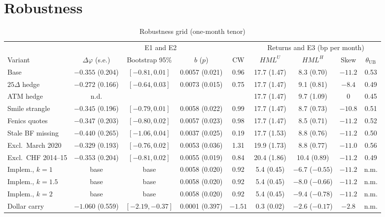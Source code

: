 \documentclass[11pt]{article}
\theoremstyle{result}
\newcommand{\HML}{\mathit{HML}}
\newcommand{\thUB}{\theta_{\mathrm{UB}}}
\newcommand{\D}{\Delta}
\begin{document}
\section{Robustness}\label{sec:robust}

\begin{table}[t]
\centering\footnotesize
\setlength{\tabcolsep}{2pt}
\caption{Robustness grid (one-month tenor)}\label{tab:rob}
\begin{tabular}{lcccccccc}
\toprule
 & \multicolumn{4}{c}{E1 and E2} & \multicolumn{4}{c}{Returns and E3 (bp per month)}\\
\cmidrule(lr){2-5}\cmidrule(lr){6-9}
Variant & $\D\varphi$ (s.e.) & Bootstrap 95\% & $b$ ($p$) & CW & $\HML^U$ & $\HML^H$ & Skew & $\thUB$ \\
\midrule
Base & $-0.355$ (0.204) & $[-0.81,0.01]$ & 0.0057 (0.021) & 0.96 & 17.7 (1.47) & 8.3 (0.70) & $-11.2$ & 0.53 \\
$25\D$ hedge & $-0.272$ (0.166) & $[-0.64,0.03]$ & 0.0073 (0.015) & 0.75 & 17.7 (1.47) & 9.1 (0.81) & $-8.4$ & 0.49 \\
ATM hedge & n.d. & & & & 17.7 (1.47) & 9.7 (1.09) & 0 & 0.45 \\
Smile strangle & $-0.345$ (0.196) & $[-0.79,0.01]$ & 0.0058 (0.022) & 0.99 & 17.7 (1.47) & 8.7 (0.73) & $-10.8$ & 0.51 \\
Fenics quotes & $-0.347$ (0.203) & $[-0.80,0.02]$ & 0.0057 (0.023) & 0.98 & 17.7 (1.47) & 8.5 (0.71) & $-11.2$ & 0.52 \\
Stale BF missing & $-0.440$ (0.265) & $[-1.06,0.04]$ & 0.0037 (0.025) & 0.19 & 17.7 (1.53) & 8.8 (0.76) & $-11.2$ & 0.50 \\
Excl.\ March 2020 & $-0.329$ (0.193) & $[-0.76,0.02]$ & 0.0053 (0.036) & 1.31 & 19.9 (1.73) & 8.8 (0.77) & $-11.0$ & 0.56 \\
Excl.\ CHF 2014--15 & $-0.353$ (0.204) & $[-0.81,0.02]$ & 0.0055 (0.019) & 0.84 & 20.4 (1.86) & 10.4 (0.89) & $-11.2$ & 0.49 \\
Implem., $k=1$ & base & base & 0.0058 (0.020) & 0.92 & 5.4 (0.45) & $-6.7$ ($-0.55$) & $-11.2$ & n.m. \\
Implem., $k=1.5$ & base & base & 0.0058 (0.020) & 0.92 & 5.4 (0.45) & $-8.0$ ($-0.66$) & $-11.2$ & n.m. \\
Implem., $k=2$ & base & base & 0.0058 (0.020) & 0.92 & 5.4 (0.45) & $-9.4$ ($-0.78$) & $-11.2$ & n.m. \\
Dollar carry & $-1.060$ (0.559) & $[-2.19,-0.37]$ & 0.0001 (0.397) & $-1.51$ & 0.3 (0.02) & $-2.6$ ($-0.17$) & $-2.8$ & n.m. \\

\end{tabular}
\end{table}
\end{document}
